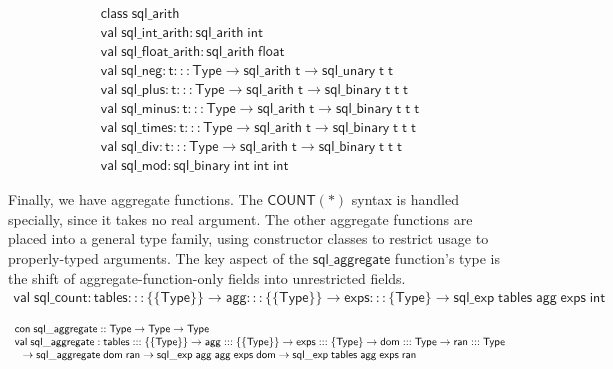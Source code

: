 \documentclass{article}
\newcommand{\mt}[1]{\mathsf{#1}}
\begin{document}
$$\begin{array}{l}
  \mt{class} \; \mt{sql\_arith} \\
  \mt{val} \; \mt{sql\_int\_arith} : \mt{sql\_arith} \; \mt{int} \\
  \mt{val} \; \mt{sql\_float\_arith} : \mt{sql\_arith} \; \mt{float} \\
  \mt{val} \; \mt{sql\_neg} : \mt{t} ::: \mt{Type} \to \mt{sql\_arith} \; \mt{t} \to \mt{sql\_unary} \; \mt{t} \; \mt{t} \\
  \mt{val} \; \mt{sql\_plus} : \mt{t} ::: \mt{Type} \to \mt{sql\_arith} \; \mt{t} \to \mt{sql\_binary} \; \mt{t} \; \mt{t} \; \mt{t} \\
  \mt{val} \; \mt{sql\_minus} : \mt{t} ::: \mt{Type} \to \mt{sql\_arith} \; \mt{t} \to \mt{sql\_binary} \; \mt{t} \; \mt{t} \; \mt{t} \\
  \mt{val} \; \mt{sql\_times} : \mt{t} ::: \mt{Type} \to \mt{sql\_arith} \; \mt{t} \to \mt{sql\_binary} \; \mt{t} \; \mt{t} \; \mt{t} \\
  \mt{val} \; \mt{sql\_div} : \mt{t} ::: \mt{Type} \to \mt{sql\_arith} \; \mt{t} \to \mt{sql\_binary} \; \mt{t} \; \mt{t} \; \mt{t} \\
  \mt{val} \; \mt{sql\_mod} : \mt{sql\_binary} \; \mt{int} \; \mt{int} \; \mt{int}
\end{array}$$

Finally, we have aggregate functions.  The $\mt{COUNT(\ast)}$ syntax is handled specially, since it takes no real argument.  The other aggregate functions are placed into a general type family, using constructor classes to restrict usage to properly-typed arguments.  The key aspect of the $\mt{sql\_aggregate}$ function's type is the shift of aggregate-function-only fields into unrestricted fields.
$$\begin{array}{l}
  \mt{val} \; \mt{sql\_count} : \mt{tables} ::: \{\{\mt{Type}\}\} \to \mt{agg} ::: \{\{\mt{Type}\}\} \to \mt{exps} ::: \{\mt{Type}\} \to \mt{sql\_exp} \; \mt{tables} \; \mt{agg} \; \mt{exps} \; \mt{int}
\end{array}$$

$$\begin{array}{l}
  \mt{con} \; \mt{sql\_aggregate} :: \mt{Type} \to \mt{Type} \to \mt{Type} \\
  \mt{val} \; \mt{sql\_aggregate} : \mt{tables} ::: \{\{\mt{Type}\}\} \to \mt{agg} ::: \{\{\mt{Type}\}\} \to \mt{exps} ::: \{\mt{Type}\} \to \mt{dom} ::: \mt{Type} \to \mt{ran} ::: \mt{Type} \\
  \hspace{.1in} \to \mt{sql\_aggregate} \; \mt{dom} \; \mt{ran} \to \mt{sql\_exp} \; \mt{agg} \; \mt{agg} \; \mt{exps} \; \mt{dom} \to \mt{sql\_exp} \; \mt{tables} \; \mt{agg} \; \mt{exps} \; \mt{ran}
\end{array}$$
\end{document}
